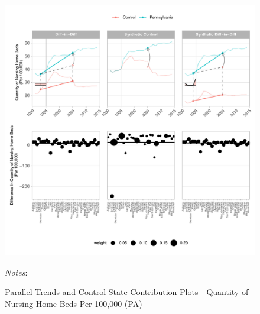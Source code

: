 \documentclass[12pt]{article}
\begin{document}
\newpage
\begin{figure}[t]
	\begin{center}
	\caption{\centering Parallel Trends and Control State Contribution Plots - Quantity of Nursing Home Beds Per 100,000 (PA)}
    \includegraphics[width=\textwidth,keepaspectratio]{q_nursing_home_beds_plots_PA.pdf}
    \end{center}
    \footnotesize
		\textit{Notes}:
\end{figure}
\clearpage
\end{document}

